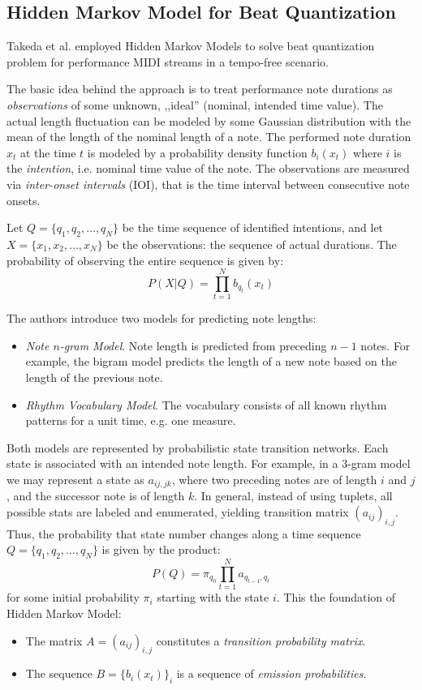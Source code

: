 \subsection{Hidden Markov Model for Beat Quantization}

Takeda et al. \cite{Takeda2002} employed Hidden Markov Models to solve beat quantization problem for performance MIDI streams in a tempo-free scenario. 

The basic idea behind the approach is to treat performance note durations as \emph{observations} of some unknown, ,,ideal'' (nominal, intended time value). The actual length fluctuation can be modeled by some Gaussian distribution with the mean of the length of the nominal length of a note. The performed note duration $x_t$ at the time $t$ is modeled by a probability density function $b_i(x_t)$ where $i$ is the \emph{intention}, i.e. nominal time value of the note. The observations are measured via \emph{inter-onset intervals} (IOI), that is the time interval between consecutive note onsets.

Let $Q = \{q_1,q_2,\ldots, q_N\}$ be the time sequence of identified intentions, and let $X=\{x_1,x_2,\ldots,x_N\}$ be the observations: the sequence of actual durations. The probability of observing the entire sequence is given by: $$P(X|Q)=\prod_{t=1}^N b_{q_t}(x_t)$$ 

The authors introduce two models for predicting note lengths: \begin{itemize}
	\item \emph{Note $n$-gram Model}. Note length is predicted from preceding $n - 1$ notes. For example, the bigram model predicts the length of a new note based on the length of the previous note.
	\item \emph{Rhythm Vocabulary Model}. The vocabulary consists of all known rhythm patterns for a unit time, e.g. one measure.\end{itemize}
	
Both models are represented by probabilistic state transition networks. Each state is associated with an intended note length. For example, in a $3$-gram model we may represent a state as $a_{ij,jk}$, where two preceding notes are of length $i$ and $j$, and the successor note is of length $k$. In general, instead of using tuplets, all possible stats are labeled and enumerated, yielding transition matrix $(a_{ij})_{i,j}$. Thus, the probability that state number changes along a time sequence $Q=\{q_1,q_2,\ldots,q_N\}$ is given by the product: $$P(Q)=\pi_{q_0}\prod_{t=1}^N a_{q_{t-1},q_t}$$ for some initial probability $\pi_i$ starting with the state $i$. This the foundation of Hidden Markov Model: \begin{itemize}
	\item The matrix $A=(a_{ij})_{i,j}$ constitutes a \emph{transition probability matrix}.
	\item The sequence $B=\{b_i(x_t)\}_{i}$ is a sequence of \emph{emission probabilities}.
\end{itemize}

